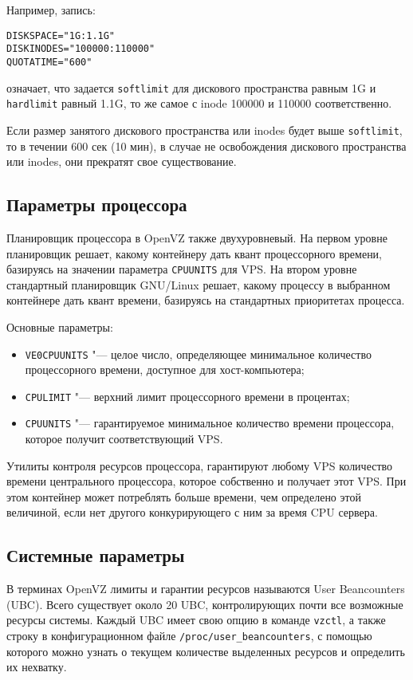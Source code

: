 Например, запись:
\begin{lstlisting}
DISKSPACE="1G:1.1G"
DISKINODES="100000:110000"
QUOTATIME="600" 
\end{lstlisting}
означает, что задается \texttt{softlimit} для дискового пространства равным 1G и \texttt{hardlimit} равный 1.1G, то же самое с inode 100000 и 110000 соответственно.

Если размер занятого дискового пространства или inodes будет выше \texttt{softlimit}, то в течении 600 сек (10 мин), в случае не освобождения дискового пространства или inodes, они прекратят свое существование.

\subsection{Параметры процессора}
Планировщик процессора в OpenVZ также двухуровневый. 
На первом уровне планировщик решает, какому контейнеру дать квант процессорного времени, базируясь на значении параметра \texttt{CPUUNITS} для VPS. 
На втором уровне стандартный планировщик GNU/Linux решает, какому процессу в выбранном контейнере дать квант времени, базируясь на стандартных приоритетах процесса.

Основные параметры:
\begin{itemize}
    \item \texttt{VE0CPUUNITS} "--- целое число, определяющее минимальное количество процессорного времени, доступное для хост-компьютера;
    \item \texttt{CPULIMIT} "--- верхний лимит процессорного времени в процентах;
    \item \texttt{CPUUNITS} "--- гарантируемое минимальное количество времени процессора, которое получит соответствующий VPS.
\end{itemize}

Утилиты контроля ресурсов процессора, гарантируют любому VPS количество времени центрального процессора, которое собственно и получает этот VPS. 
При этом контейнер может потреблять больше времени, чем определено этой величиной, если нет другого конкурирующего с ним за время CPU сервера.

\subsection{Системные параметры}

В терминах OpenVZ лимиты и гарантии ресурсов называются User Beancounters (UBC). 
Всего существует около 20 UBC, контролирующих почти все возможные ресурсы системы. 
Каждый UBC имеет свою опцию в команде \texttt{vzctl}, а также строку в конфигурационном файле \texttt{/proc/user\_beancounters}, с помощью которого можно узнать о текущем количестве выделенных ресурсов и определить их нехватку. 

